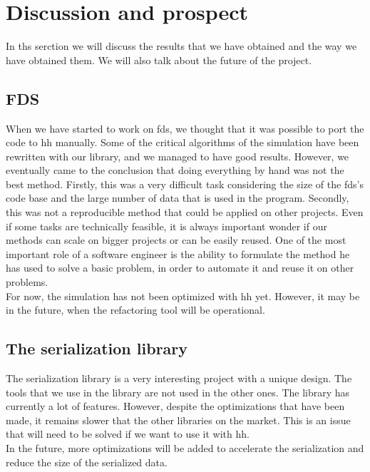 
\clearpage
\section{Discussion and prospect}

In ths serction we will discuss the results that we have obtained and the way we
have obtained them. We will also talk about the future of the project.

\subsection{FDS}

When we have started to work on \gls{fds}, we thought that it was possible to
port the code to \gls{hh} manually. Some of the critical algorithms of the
simulation have been rewritten with our library, and we managed to have good
results. However, we eventually came to the conclusion that doing everything by
hand was not the best method. Firstly, this was a very difficult task
considering the size of the \gls{fds}'s code base and the large number of data
that is used in the program. Secondly, this was not a reproducible method that
could be applied on other projects. Even if some tasks are technically feasible,
it is always important wonder if our methods can scale on bigger projects or can
be easily reused. One of the most important role of a software engineer is the
ability to formulate the method he has used to solve a basic problem, in order
to automate it and reuse it on other problems.\\

For now, the simulation has not been optimized with \gls{hh} yet. However, it
may be in the future, when the refactoring tool will be operational.

\subsection{The serialization library}

The serialization library is a very interesting project with a unique design.
The tools that we use in the library are not used in the other ones. The library
has currently a lot of features. However, despite the optimizations that have
been made, it remains slower that the other libraries on the market. This is an
issue that will need to be solved if we want to use it with \gls{hh}.\\

In the future, more optimizations will be added to accelerate the serialization
and reduce the size of the serialized data.
